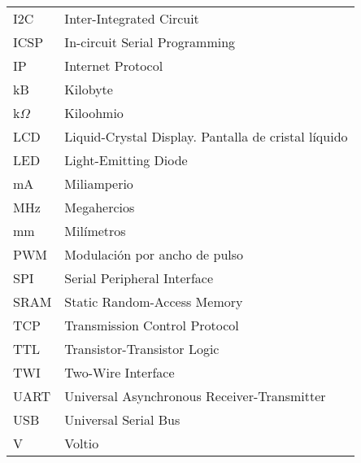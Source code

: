 \begin{longtable}{p{3cm}p{8.5cm}}
I2C & Inter-Integrated Circuit \\
ICSP & In-circuit Serial Programming \\
IP & Internet Protocol \\
kB & Kilobyte \\
k$\Omega$ & Kiloohmio \\
LCD & Liquid-Crystal Display. Pantalla de cristal líquido \\
LED & Light-Emitting Diode \\
mA & Miliamperio \\
MHz & Megahercios \\
mm & Milímetros \\
PWM & Modulación por ancho de pulso \\
SPI & Serial Peripheral Interface \\
SRAM & Static Random-Access Memory \\
TCP & Transmission Control Protocol \\
TTL & Transistor-Transistor Logic\\
TWI & Two-Wire Interface \\
UART & Universal Asynchronous Receiver-Transmitter \\
USB & Universal Serial Bus \\
V & Voltio \\



\end{longtable}
\newpage
%




